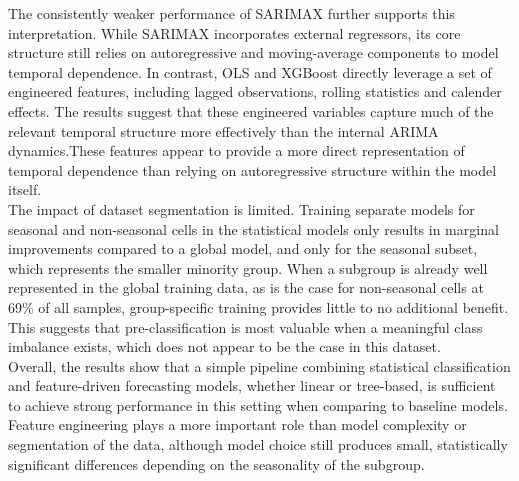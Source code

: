 The consistently weaker performance of SARIMAX further supports this interpretation. While SARIMAX incorporates external regressors, its core structure still relies on autoregressive and moving-average components to model temporal dependence. In contrast, OLS and XGBoost directly leverage a set of engineered features, including lagged observations, rolling statistics and calender effects. The results suggest that these engineered variables capture much of the relevant temporal structure more effectively than the internal ARIMA dynamics.These features appear to provide a more direct representation of temporal dependence than relying on autoregressive structure within the model itself. \\

The impact of dataset segmentation is limited. Training separate models for seasonal and non-seasonal cells in the statistical models only results in marginal improvements compared to a global model, and only for the seasonal subset, which represents the smaller minority group. When a subgroup is already well represented in the global training data, as is the case for non-seasonal cells at 69\% of all samples, group-specific training provides little to no additional benefit. This suggests that pre-classification is most valuable when a meaningful class imbalance exists, which does not appear to be the case in this dataset. \\

Overall, the results show that a simple pipeline combining statistical classification and feature-driven forecasting models, whether linear or tree-based, is sufficient to achieve strong performance in this setting when comparing to baseline models. Feature engineering plays a more important role than model complexity or segmentation of the data, although model choice still produces small, statistically significant differences depending on the seasonality of the subgroup. \\




